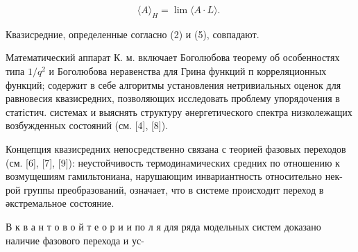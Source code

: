 \documentclass[10pt]{article}
\begin{document}
\[

\langle A\rangle_{H}=\lim \langle A \cdot L\rangle \text {. }

\]



Квазисредние, определенные согласно (2) и (5), совпадают.



Математический аппарат К. м. включает Боголюбова теорему об особенностях типа $1 / q^{2}$ и Боголюбова неравенства для Грина функций п корреляционных функций; содержит в себе алгоритмы установления нетривиальных оценок для равновесия квазисредних, позволяющих исследовать проблему упорядочения в статістич. системах и выяснять структуру әнергетического спектра низколежащих возбужденных состояний (см. [4], [8]).



Концепция квазисредних непосредственно связана с теорией фазовых переходов (см. [6], [7], [9]): неустойчивость термодинамических средних по отношению к возмущешиям гамильтониана, нарушающим инвариантность относительно нек-рой группы преобразований, означает, что в системе происходит переход в әкстремальное состояние.



В к в а н т о в о й т е о р и и по л я для ряда модельных систем доказано наличие фазового перехода и ус-
\end{document}
